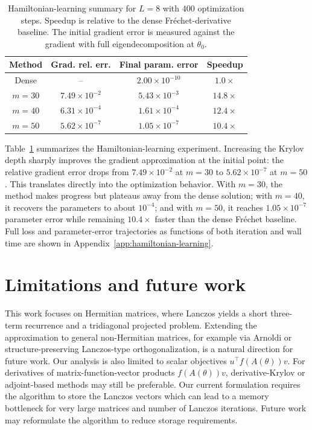 \documentclass{article}
\begin{document}
\begin{table}[t]
\centering
\small
\caption{
Hamiltonian-learning summary for $L=8$ with $400$ optimization steps.
Speedup is relative to the dense Fr\'echet-derivative baseline. The initial
gradient error is measured against the gradient with full eigendecomposition at $\theta_0$.
}
\label{tab:hamiltonian-learning}
\begin{tabular}{cccc}
\toprule
Method & Grad. rel. err. & Final param. error & Speedup \\
\midrule
Dense & -- & $2.00{\times}10^{-10}$ & $1.0{\times}$ \\
$m=30$ & $7.49{\times}10^{-2}$ & $5.43{\times}10^{-3}$ & $14.8{\times}$ \\
$m=40$ & $6.31{\times}10^{-4}$ & $1.61{\times}10^{-4}$ & $12.4{\times}$ \\
 $m=50$ & $5.62{\times}10^{-7}$ & $1.05{\times}10^{-7}$ & $10.4{\times}$ \\
\bottomrule
\end{tabular}
\end{table}


Table~\ref{tab:hamiltonian-learning} summarizes the Hamiltonian-learning experiment.
Increasing the Krylov depth sharply improves the gradient approximation at the
initial point: the relative gradient error drops from $7.49{\times}10^{-2}$ at
$m=30$ to $5.62{\times}10^{-7}$ at $m=50$. This translates directly into the
optimization behavior. With $m=30$, the method makes progress but plateaus away from
the dense solution; with $m=40$, it recovers the parameters to about $10^{-4}$; and
with $m=50$, it reaches $1.05{\times}10^{-7}$ parameter error while remaining
$10.4\times$ faster than the dense Fr\'echet baseline. Full loss and parameter-error
trajectories as functions of both iteration and wall time are shown in
Appendix~\ref{app:hamiltonian-learning}.







\section{Limitations and future work}
This work focuses on Hermitian matrices, where Lanczos yields a short three-term recurrence and a tridiagonal projected problem. Extending the approximation to general non-Hermitian matrices, for example via Arnoldi or structure-preserving Lanczos-type orthogonalization, is a natural direction for future work. Our analysis is also limited to scalar objectives \(u^\top f(A(\theta))v\). For derivatives of matrix-function-vector products \(f(A(\theta))v\), derivative-Krylov or adjoint-based methods may still be preferable. Our current formulation requires the algorithm to store the Lanczos vectors which can lead to a memory bottleneck for very large matrices and number of Lanczos iterations. Future work may reformulate the algorithm to reduce storage requirements.
\end{document}

